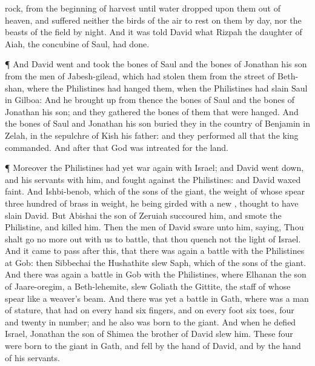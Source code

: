 {rock, from the
beginning of
harvest until
water
dropped upon them out of
heaven, and
suffered neither the
birds of the
air to
rest on them by
day, nor the
beasts of the
field by
night.
And it was
told
David what
Rizpah the
daughter of
Aiah, the
concubine of
Saul, had
done.
\par }{\PP {}¶ And
David
went and
took the
bones of
Saul and the
bones of
Jonathan his
son from the
men of
Jabesh-gilead, which had
stolen them from the
street of
Beth-shan, where the
Philistines had
hanged them,
when the
Philistines had
slain
Saul in
Gilboa:
And he brought
up from thence the
bones of
Saul and the
bones of
Jonathan his
son; and they
gathered the
bones of them that were
hanged.
And the
bones of
Saul and
Jonathan his
son
buried they in the
country of
Benjamin in
Zelah, in the
sepulchre of
Kish his
father: and they
performed all that the
king
commanded. And
after that
God was
intreated for the
land.
\par }{\PP {}¶ Moreover the
Philistines had yet
war again with
Israel; and
David went
down, and his
servants with him, and
fought against the
Philistines: and
David waxed
faint.
And
Ishbi-benob, which
{} of the
sons of the
giant, the
weight of whose
spear
{}
three
hundred
{} of
brass in
weight, he being
girded with a
new
{},
thought to have
slain
David.
But
Abishai the
son of
Zeruiah
succoured him, and
smote the
Philistine, and
killed him. Then the
men of
David
sware unto him,
saying, Thou shalt
go no more out with us to
battle, that thou
quench not the
light of
Israel.
And it came to pass after
this, that there was again a
battle with the
Philistines at
Gob: then
Sibbechai the
Hushathite
slew
Saph, which
{} of the
sons of the
giant.
And there was again a
battle in
Gob with the
Philistines, where
Elhanan the
son of
Jaare-oregim, a
Beth-lehemite,
slew
{}
Goliath the
Gittite, the
staff of whose
spear
{} like a
weaver’s
beam.
And there was yet a
battle in
Gath, where was a
man of
{}
stature, that had on every
hand
six
fingers, and on every
foot
six
toes,
four and
twenty in
number; and he also was
born to the
giant.
And when he
defied
Israel,
Jonathan the
son of
Shimea the
brother of
David
slew him.
These
four were
born to the
giant in
Gath, and
fell by the
hand of
David, and by the
hand of his
servants.

}
